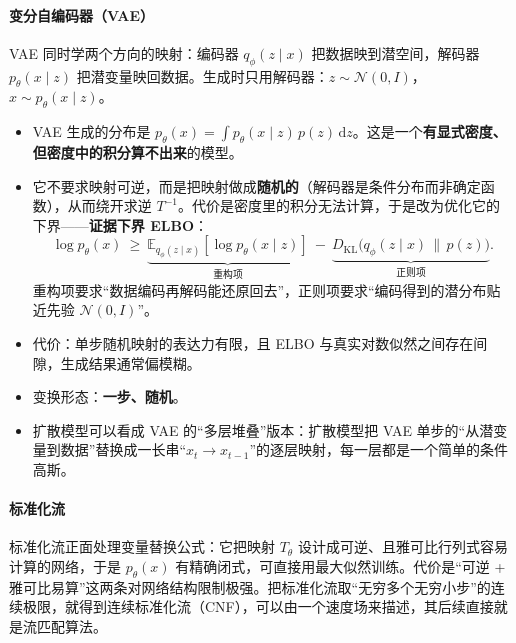 \paragraph{变分自编码器（VAE）}

VAE 同时学两个方向的映射：编码器 $q_\phi(z\mid x)$ 把数据映到潜空间，解码器 $p_\theta(x\mid z)$ 把潜变量映回数据。生成时只用解码器：$z\sim\mathcal N(0,I)$，$x\sim p_\theta(x\mid z)$。
\begin{itemize}
\item VAE 生成的分布是 $p_\theta(x) = \int p_\theta(x\mid z)\,p(z)\,\mathrm{d}z$。这是一个\textbf{有显式密度、但密度中的积分算不出来}的模型。
\item 它不要求映射可逆，而是把映射做成\textbf{随机的}（解码器是条件分布而非确定函数），从而绕开求逆 $T^{-1}$。代价是密度里的积分无法计算，于是改为优化它的下界——\textbf{证据下界 ELBO}：
\begin{equation}
\log p_\theta(x)\ \ge\ \underbrace{\mathbb{E}_{q_\phi(z\mid x)}[\log p_\theta(x\mid z)]}_{\text{重构项}}\ -\ \underbrace{D_{\text{KL}}\big(q_\phi(z\mid x)\,\|\,p(z)\big)}_{\text{正则项}}.
\end{equation}
重构项要求“数据编码再解码能还原回去”，正则项要求“编码得到的潜分布贴近先验 $\mathcal N(0,I)$”。
\item 代价：单步随机映射的表达力有限，且 ELBO 与真实对数似然之间存在间隙，生成结果通常偏模糊。
\item 变换形态：\textbf{一步、随机}。
\item 扩散模型可以看成 VAE 的“多层堆叠”版本：扩散模型把 VAE 单步的“从潜变量到数据”替换成一长串“$x_t\to x_{t-1}$”的逐层映射，每一层都是一个简单的条件高斯。
\end{itemize}

\paragraph{标准化流} 标准化流正面处理变量替换公式：它把映射 $T_\theta$ 设计成可逆、且雅可比行列式容易计算的网络，于是 $p_\theta(x)$ 有精确闭式，可直接用最大似然训练。代价是“可逆 + 雅可比易算”这两条对网络结构限制极强。把标准化流取“无穷多个无穷小步”的连续极限，就得到连续标准化流（CNF），可以由一个速度场来描述，其后续直接就是流匹配算法。


